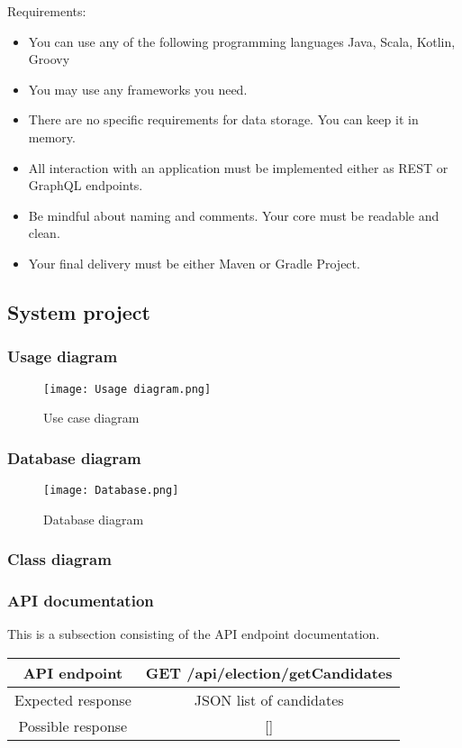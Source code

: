 \documentclass[12pt,a4paper]{article}
\begin{document}
Requirements:
\begin{itemize}
    \item
        You can use any of the following programming languages Java, Scala, Kotlin, Groovy
    \item
        You may use any frameworks you need.
    \item
        There are no specific requirements for data storage. You can keep it in
        memory.
    \item
        All interaction with an application must be implemented either as REST
        or GraphQL endpoints.
    \item
        Be mindful about naming and comments. Your core must be readable and
        clean.
    \item
        Your final delivery must be either Maven or Gradle Project.
\end{itemize}

\subsection{System project}
\subsubsection{Usage diagram}
\begin{figure}[htbp!]
    \begin{center}
        \texttt{[image: Usage diagram.png]}
    \end{center}
    \caption{Use case diagram}
\end{figure}

\subsubsection{Database diagram}
\begin{figure}[htbp!]
    \begin{center}
        \texttt{[image: Database.png]}
    \end{center}
    \caption{Database diagram}
\end{figure}
\subsubsection{Class diagram}
\subsubsection{API documentation}
This is a subsection consisting of the API endpoint documentation.
\begin{center}
\begin{tabular}{ |c|c| }
 \hline
 API endpoint & GET /api/election/getCandidates \\ \hline
 Expected response & JSON list of candidates \\ \hline
 Possible response & []\\
 \hline
\end{tabular}
\end{center}
\end{document}
